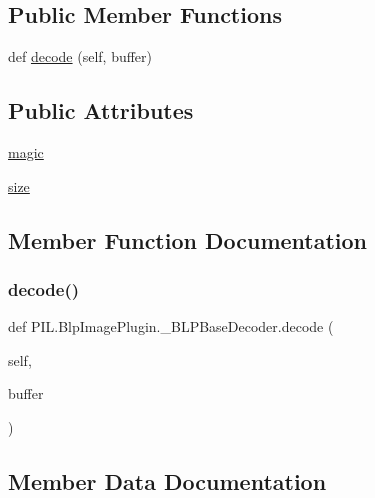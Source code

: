 \subsection*{Public Member Functions}
\begin{DoxyCompactItemize}
\item 
def \hyperlink{classPIL_1_1BlpImagePlugin_1_1__BLPBaseDecoder_ae5226aa8ea89d7372e1304b328348909}{decode} (self, buffer)
\end{DoxyCompactItemize}
\subsection*{Public Attributes}
\begin{DoxyCompactItemize}
\item 
\hyperlink{classPIL_1_1BlpImagePlugin_1_1__BLPBaseDecoder_ac6c7caea56cc7ba9f8b46c2a3705c673}{magic}
\item 
\hyperlink{classPIL_1_1BlpImagePlugin_1_1__BLPBaseDecoder_a818076499fc94a1ceebb1e3058795451}{size}
\end{DoxyCompactItemize}


\subsection{Member Function Documentation}
\mbox{\label{classPIL_1_1BlpImagePlugin_1_1__BLPBaseDecoder_ae5226aa8ea89d7372e1304b328348909}} 
\subsubsection{\texorpdfstring{decode()}{decode()}}
{\footnotesize\ttfamily def P\+I\+L.\+Blp\+Image\+Plugin.\+\_\+\+B\+L\+P\+Base\+Decoder.\+decode (\begin{DoxyParamCaption}\item[{}]{self,  }\item[{}]{buffer }\end{DoxyParamCaption})}



\subsection{Member Data Documentation}
\mbox{\label{classPIL_1_1BlpImagePlugin_1_1__BLPBaseDecoder_ac6c7caea56cc7ba9f8b46c2a3705c673}} 

